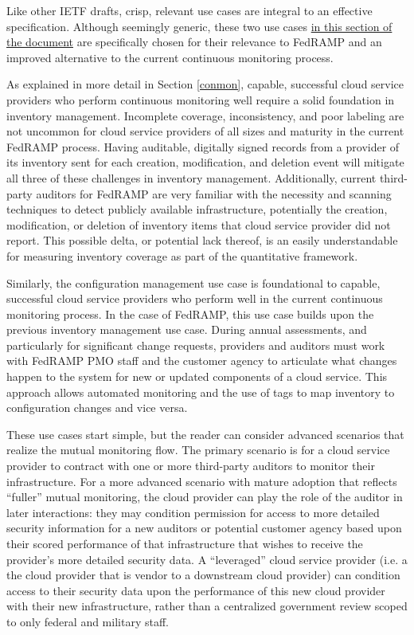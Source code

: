 \documentclass{jdf}
\begin{document}
Like other IETF drafts, crisp, relevant use cases are integral to an effective specification. Although seemingly generic, these two use cases \href{https://aj-stein.github.io/conmotion/architecture.html#use-cases}{in this section of the document} are specifically chosen for their relevance to FedRAMP and an improved alternative to the current continuous monitoring process.

As explained in more detail in Section \ref{conmon}, capable, successful cloud service providers who perform continuous monitoring well require a solid foundation in inventory management. Incomplete coverage, inconsistency, and poor labeling are not uncommon for cloud service providers of all sizes and maturity in the current FedRAMP process. Having auditable, digitally signed records from a provider of its inventory sent for each creation, modification, and deletion event will mitigate all three of these challenges in inventory management. Additionally, current third-party auditors for FedRAMP are very familiar with the necessity and scanning techniques to detect publicly available infrastructure, potentially the creation, modification, or deletion of inventory items that cloud service provider did not report. This possible delta, or potential lack thereof, is an easily understandable for measuring inventory coverage as part of the quantitative framework.

Similarly, the configuration management use case is foundational to capable, successful cloud service providers who perform well in the current continuous monitoring process. In the case of FedRAMP, this use case builds upon the previous inventory management use case. During annual assessments, and particularly for significant change requests, providers and auditors must work with FedRAMP PMO staff and the customer agency to articulate what changes happen to the system for new or updated components of a cloud service. This approach allows automated monitoring and the use of tags to map inventory to configuration changes and vice versa.

These use cases start simple, but the reader can consider advanced scenarios that realize the mutual monitoring flow. The primary scenario is for a cloud service provider to contract with one or more third-party auditors to monitor their infrastructure. For a more advanced scenario with mature adoption that reflects ``fuller'' mutual monitoring, the cloud provider can play the role of the auditor in later interactions: they may condition permission for access to more detailed security information for a new auditors or potential customer agency based upon their scored performance of that infrastructure that wishes to receive the provider's more detailed security data. A ``leveraged'' cloud service provider (i.e. a the cloud provider that is vendor to a downstream cloud provider) can condition access to their security data upon the performance of this new cloud provider with their new infrastructure, rather than a centralized government review scoped to only federal and military staff.
\end{document}
